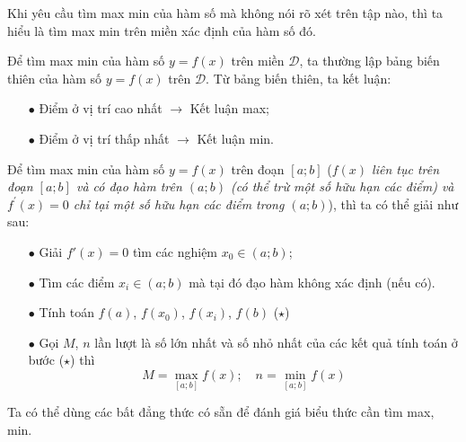 \begin{note}
	\begin{listEX}[1]
		\item [\ding{172}] Khi yêu cầu tìm max min của hàm số mà không nói rõ xét trên tập nào, thì ta hiểu là tìm max min trên miền xác định của hàm số đó.
		\item [\ding{173}] Để tìm max min của hàm số $y=f(x)$ trên miền $\mathscr{D}$, ta thường lập bảng biến thiên của hàm số $y=f(x)$ trên $\mathscr{D}$. Từ bảng biến thiên, ta kết luận:
		\begin{itemize}
			\item [$\bullet$] Điểm ở vị trí cao nhất $\longrightarrow$ Kết luận max;
			\item [$\bullet$] Điểm ở vị trí thấp nhất $\longrightarrow$ Kết luận min.
		\end{itemize}
		\item [\ding{174}] Để tìm max min của hàm số $y=f(x)$ trên đoạn $[a;b]$ (\textit{$f(x)$ liên tục trên đoạn $[a ; b]$ và có đạo hàm trên $(a ; b)$ (có thể trừ một số hữu hạn các điểm) và $f^{\prime}(x)=0$ chỉ tại một số hữu hạn các điểm trong $(a ; b)$}), thì ta có thể giải như sau:
		\begin{itemize}
			\item [$\bullet$] Giải $f'(x)=0$ tìm các nghiệm $x_0 \in (a;b)$; 
			\item [$\bullet$] Tìm các điểm $x_i\in (a;b)$ mà tại đó đạo hàm không xác định (nếu có).
			\item [$\bullet$] Tính toán $f(a)$, $f(x_0)$, $f(x_i)$, $f(b)$ \quad ($\star$)
			\item [$\bullet$]  Gọi $M$, $n$ lần lượt là số lớn nhất và số nhỏ nhất của các kết quả tính toán ở bước ($\star$) thì
			$$M=\displaystyle\max_{[a;b]}f(x); \quad n=\displaystyle\min_{[a;b]}f(x)$$
		\end{itemize}
	\item [\ding{175}] Ta có thể dùng các bất đẳng thức có sẵn để đánh giá biểu thức cần tìm max, min. 
	\end{listEX}
\end{note}

